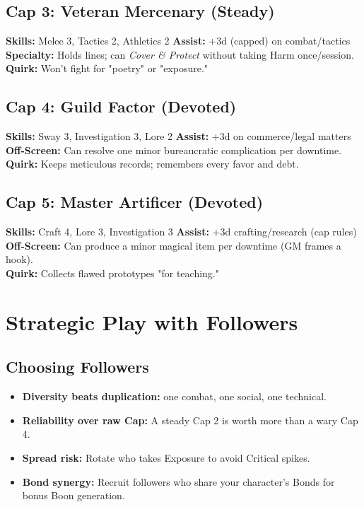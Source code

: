 \subsection*{Cap 3: Veteran Mercenary (Steady)}
\textbf{Skills:} Melee 3, Tactics 2, Athletics 2 \quad
\textbf{Assist:} +3d (capped) on combat/tactics \\
\textbf{Specialty:} Holds lines; can \emph{Cover \& Protect} without taking Harm once/session. \\
\textbf{Quirk:} Won't fight for "poetry" or "exposure."

\subsection*{Cap 4: Guild Factor (Devoted)}
\textbf{Skills:} Sway 3, Investigation 3, Lore 2 \quad
\textbf{Assist:} +3d on commerce/legal matters \\
\textbf{Off-Screen:} Can resolve one minor bureaucratic complication per downtime. \\
\textbf{Quirk:} Keeps meticulous records; remembers every favor and debt.

\subsection*{Cap 5: Master Artificer (Devoted)}
\textbf{Skills:} Craft 4, Lore 3, Investigation 3 \quad
\textbf{Assist:} +3d crafting/research (cap rules) \\
\textbf{Off-Screen:} Can produce a minor magical item per downtime (GM frames a hook). \\
\textbf{Quirk:} Collects flawed prototypes "for teaching."

\section{Strategic Play with Followers}

\subsection*{Choosing Followers}
\begin{itemize}
  \item \textbf{Diversity beats duplication:} one combat, one social, one technical.
  \item \textbf{Reliability over raw Cap:} A steady Cap 2 is worth more than a wary Cap 4.
  \item \textbf{Spread risk:} Rotate who takes Exposure to avoid Critical spikes.
  \item \textbf{Bond synergy:} Recruit followers who share your character’s Bonds for bonus Boon generation.
\end{itemize}


